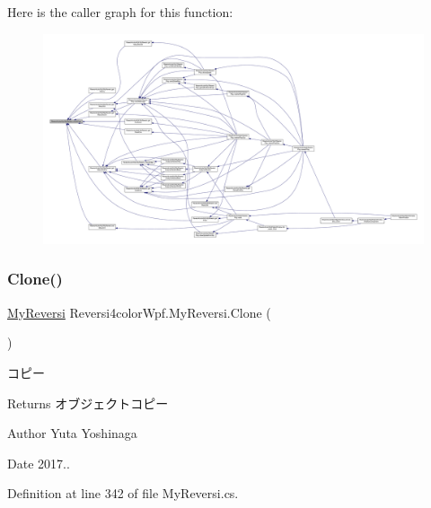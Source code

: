 Here is the caller graph for this function\+:
\nopagebreak
\begin{figure}[H]
\begin{center}
\leavevmode
\includegraphics[width=350pt]{class_reversi4color_wpf_1_1_my_reversi_a0b9374fdb5d82d5e59cddeb5f25ef676_icgraph}
\end{center}
\end{figure}
\mbox{\label{class_reversi4color_wpf_1_1_my_reversi_aef07eb98636639a953974d267ed8dceb}} 
\subsubsection{\texorpdfstring{Clone()}{Clone()}}
{\footnotesize\ttfamily \hyperlink{class_reversi4color_wpf_1_1_my_reversi}{My\+Reversi} Reversi4color\+Wpf.\+My\+Reversi.\+Clone (\begin{DoxyParamCaption}{ }\end{DoxyParamCaption})}



コピー 

\begin{DoxyReturn}{Returns}
オブジェクトコピー 
\end{DoxyReturn}
\begin{DoxyAuthor}{Author}
Yuta Yoshinaga 
\end{DoxyAuthor}
\begin{DoxyDate}{Date}
2017.. 
\end{DoxyDate}


Definition at line 342 of file My\+Reversi.\+cs.

\mbox{\label{class_reversi4color_wpf_1_1_my_reversi_aeb3aac2b535091f0c31b69c35e3bee3b}} 
